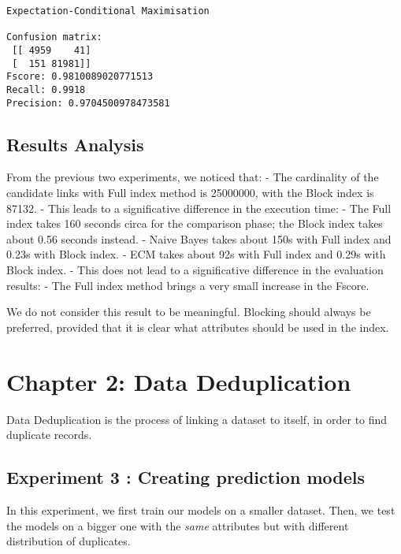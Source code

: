 \documentclass{article}
\begin{document}
    \begin{Verbatim}[commandchars=\\\{\}]
Expectation-Conditional Maximisation 

Confusion matrix: 
 [[ 4959    41]
 [  151 81981]]
Fscore: 0.9810089020771513
Recall: 0.9918
Precision: 0.9704500978473581

    \end{Verbatim}

    \hypertarget{results-analysis}{%
\subsection{Results Analysis}\label{results-analysis}}

From the previous two experiments, we noticed that: - The cardinality of
the candidate links with Full index method is 25000000, with the Block
index is 87132. - This leads to a significative difference in the
execution time: - The Full index takes 160 seconds circa for the
comparison phase; the Block index takes about 0.56 seconds instead. -
Naive Bayes takes about 150s with Full index and 0.23s with Block index.
- ECM takes about 92s with Full index and 0.29s with Block index. - This
does not lead to a significative difference in the evaluation results: -
The Full index method brings a very small increase in the Fscore.

We do not consider this result to be meaningful. Blocking should always
be preferred, provided that it is clear what attributes should be used
in the index.

    \hypertarget{chapter-2-data-deduplication}{%
\section{Chapter 2: Data
Deduplication}\label{chapter-2-data-deduplication}}

Data Deduplication is the process of linking a dataset to itself, in
order to find duplicate records.

    \hypertarget{experiment-3-creating-prediction-models}{%
\subsection{Experiment 3 : Creating prediction
models}\label{experiment-3-creating-prediction-models}}

In this experiment, we first train our models on a smaller dataset.
Then, we test the models on a bigger one with the \emph{same} attributes
but with different distribution of duplicates.
\end{document}
